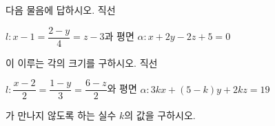 다음 물음에 답하시오.
 직선 \par\smallskip\centerline{$l\colon x-1=\dfrac{2-y}{4}=z-3$과 평면 $\alpha\colon x+2y-2z+5=0$}\par\smallskip\noindent 이 이루는 각의 크기를 구하시오.
 직선 \par\smallskip\centerline{$l\colon \dfrac{x-2}{2}=\dfrac{1-y}{3}=\dfrac{6-z}{2}$와 평면 $\alpha\colon 3kx+(5-k)y+2kz=19$}\par\smallskip\noindent 가 만나지 않도록 하는 실수 $k$의 값을 구하시오.
